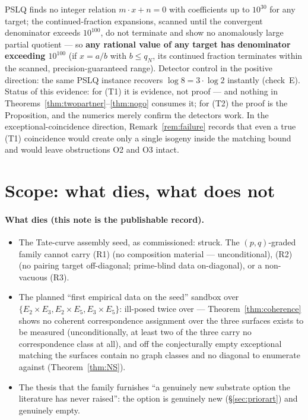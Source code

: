 \documentclass[11pt]{article}
\theoremstyle{definition}
\theoremstyle{remark}
\begin{document}
PSLQ finds no integer relation $m\cdot x + n = 0$ with coefficients up to
$10^{30}$ for any target; the continued-fraction expansions, scanned until
the convergent denominator exceeds $10^{100}$, do not terminate and show no
anomalously large partial quotient --- so \textbf{any rational value of any
target has denominator exceeding $10^{100}$} (if $x = a/b$ with
$b \leq q_N$, its continued fraction terminates within the scanned,
precision-guaranteed range). Detector control in the positive direction: the
same PSLQ instance recovers $\log 8 = 3\cdot\log 2$ instantly (check~E).
Status of this evidence: for (T1) it is evidence, not proof --- and nothing
in Theorems~\ref{thm:twopartner}--\ref{thm:nogo} consumes it; for (T2) the
proof is the Proposition, and the numerics merely confirm the detectors
work. In the exceptional-coincidence direction, Remark~\ref{rem:failure}
records that even a true (T1) coincidence would create only a single isogeny
inside the matching bound and would leave obstructions O2 and O3 intact.

\section{Scope: what dies, what does not}
\label{sec:scope}

\paragraph{What dies (this note is the publishable record).}
\begin{itemize}
\item The Tate-curve assembly seed, as commissioned: struck. The
$(p,q)$-graded family cannot carry (R1) (no composition material ---
unconditional), (R2) (no pairing target off-diagonal; prime-blind data
on-diagonal), or a non-vacuous (R3).
\item The planned ``first empirical data on the seed'' sandbox over
$\{E_2\times E_3, E_2\times E_5, E_3\times E_5\}$: ill-posed twice over ---
Theorem~\ref{thm:coherence} shows no coherent correspondence assignment over
the three surfaces exists to be measured (unconditionally, at least two of
the three carry no correspondence class at all), and off the conjecturally
empty exceptional matching the surfaces contain no graph classes and no
diagonal to enumerate against (Theorem~\ref{thm:NS}).
\item The thesis that the family furnishes ``a genuinely new substrate
option the literature has never raised'': the option is genuinely new
(\S\ref{sec:priorart}) and genuinely empty.
\end{itemize}
\end{document}
